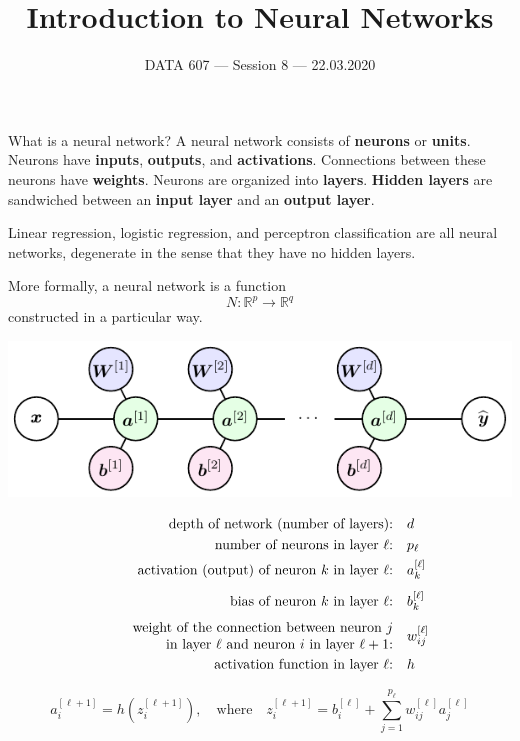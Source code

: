 \documentclass{beamer}
\newcommand{\RR}{\mathbb{R}}
\newcommand{\lra}{\longrightarrow}
\begin{document}
    
\setlength{\parskip}{1em}
\begin{frame}
    \title{Introduction to Neural Networks}
    \date{DATA 607 --- Session 8 --- 22.03.2020}
    \maketitle
\end{frame}

\begin{frame}{What is a neural network?}
    A neural network consists of \textbf{neurons} or \textbf{units}.
    Neurons have \textbf{inputs}, \textbf{outputs}, and \textbf{activations}.
    Connections between these neurons have \textbf{weights}.
    Neurons are organized into \textbf{layers}. \textbf{Hidden layers}
    are sandwiched between an \textbf{input layer} and an \textbf{output layer}.

    Linear regression, logistic regression, and perceptron classification are all
    neural networks, degenerate in the sense that they have no hidden layers.
\end{frame}

\begin{frame}{}
    More formally, a neural network is a function
    \[
        N:\RR^p\lra \RR^q
    \]
    constructed in a particular way.

    \begin{center}
    \includegraphics{basic_nn_vectorized.pdf}
    \end{center}
\end{frame}

\begin{frame}{}
    \begin{align*}
        \text{depth of network (number of layers):\quad}&d\\
        \text{number of neurons in layer $\ell$:\quad}&p_\ell\\
        \text{activation (output) of neuron $k$ in layer $\ell$:\quad}
        & a_k^{[\ell]}\\[1ex]
        \text{bias of neuron $k$ in layer $\ell$:\quad}& b_k^{[\ell]}\\[1ex]
        \text{\parbox{3in}{\raggedleft weight of the connection between neuron $j$\\
        in layer $\ell$ and neuron $i$ in layer $\ell+1$:}\quad}& w^{[\ell]}_{ij}\\
        \text{activation function in layer $\ell$:\quad}&h
    \end{align*}

    \[
        a^{[\ell+1]}_i = h\left(z_i^{[\ell+1]}\right),
        \quad\text{where}\quad
        z_i^{[\ell+1]}=b_i^{[\ell]} + \sum_{j=1}^{p_\ell} w_{ij}^{[\ell]}a_j^{[\ell]}
    \]
\end{frame}
\end{document}
